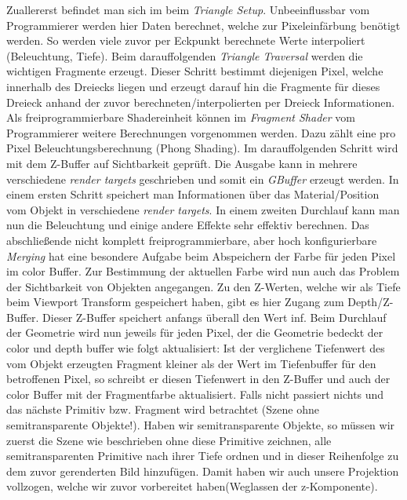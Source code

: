         
        Zuallererst befindet man sich im  beim \textit{Triangle Setup}. Unbeeinflussbar vom Programmierer werden hier Daten berechnet, welche zur Pixeleinfärbung
        benötigt werden. So werden viele zuvor per Eckpunkt berechnete Werte interpoliert (Beleuchtung, Tiefe). Beim darauffolgenden \textit{Triangle Traversal} werden
        die wichtigen Fragmente erzeugt. Dieser Schritt bestimmt diejenigen Pixel, welche innerhalb des Dreiecks liegen und erzeugt darauf hin die Fragmente für dieses
        Dreieck anhand der zuvor berechneten/interpolierten per Dreieck Informationen. Als freiprogrammierbare Shadereinheit können im \textit{Fragment Shader}
        vom Programmierer weitere Berechnungen vorgenommen werden. Dazu zählt eine pro Pixel Beleuchtungsberechnung (Phong Shading).
        Im darauffolgenden Schritt wird mit dem Z-Buffer auf Sichtbarkeit geprüft. Die Ausgabe kann in mehrere verschiedene \textit{render targets}
        geschrieben und somit ein \textit{GBuffer} erzeugt werden. In einem ersten Schritt speichert man Informationen
        über das Material/Position vom Objekt in verschiedene \textit{render targets}. In einem zweiten Durchlauf kann man nun die Beleuchtung und einige andere 
        Effekte sehr effektiv berechnen.  
        Das abschließende nicht komplett freiprogrammierbare, aber hoch konfigurierbare \textit{Merging} hat eine besondere Aufgabe beim Abspeichern der Farbe für
        jeden Pixel im color Buffer. Zur Bestimmung der aktuellen Farbe wird nun auch das Problem der 
        Sichtbarkeit von Objekten angegangen. Zu den Z-Werten, welche wir als Tiefe beim Viewport Transform gespeichert haben, gibt
        es hier Zugang zum Depth/Z-Buffer. Dieser Z-Buffer speichert anfangs überall den Wert inf. Beim Durchlauf der Geometrie wird nun jeweils für jeden Pixel,
        der die Geometrie bedeckt der color und depth buffer wie folgt aktualisiert: Ist der verglichene Tiefenwert des vom Objekt erzeugten Fragment kleiner als der Wert
        im Tiefenbuffer für den betroffenen Pixel, so schreibt er diesen Tiefenwert in den Z-Buffer und auch der color Buffer mit der Fragmentfarbe aktualisiert.
        Falls nicht passiert nichts und das nächste Primitiv bzw. Fragment wird betrachtet (Szene ohne semitransparente Objekte!). Haben wir semitransparente Objekte, so 
        müssen wir zuerst die Szene wie beschrieben ohne diese Primitive zeichnen, alle semitransparenten Primitive nach ihrer Tiefe ordnen und in dieser Reihenfolge 
        zu dem zuvor gerenderten Bild hinzufügen. Damit haben wir auch unsere Projektion vollzogen, welche wir zuvor vorbereitet 
        haben(Weglassen der z-Komponente).\par 
        
